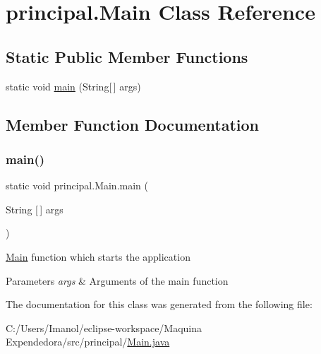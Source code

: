 \hypertarget{classprincipal_1_1_main}{}\section{principal.\+Main Class Reference}
\label{classprincipal_1_1_main}
\subsection*{Static Public Member Functions}
\begin{DoxyCompactItemize}
\item 
static void \mbox{\hyperlink{classprincipal_1_1_main_a8c5178ba5330fea05fc8588925aa0947}{main}} (String\mbox{[}$\,$\mbox{]} args)
\end{DoxyCompactItemize}


\subsection{Member Function Documentation}
\mbox{\label{classprincipal_1_1_main_a8c5178ba5330fea05fc8588925aa0947}} 
\subsubsection{\texorpdfstring{main()}{main()}}
{\footnotesize\ttfamily static void principal.\+Main.\+main (\begin{DoxyParamCaption}\item[{String \mbox{[}$\,$\mbox{]}}]{args }\end{DoxyParamCaption})\hspace{0.3cm}{\ttfamily [static]}}

\mbox{\hyperlink{classprincipal_1_1_main}{Main}} function which starts the application 
\begin{DoxyParams}{Parameters}
{\em args} & Arguments of the main function \\
\hline
\end{DoxyParams}


The documentation for this class was generated from the following file\+:\begin{DoxyCompactItemize}
\item 
C\+:/\+Users/\+Imanol/eclipse-\/workspace/\+Maquina Expendedora/src/principal/\mbox{\hyperlink{_main_8java}{Main.\+java}}\end{DoxyCompactItemize}
